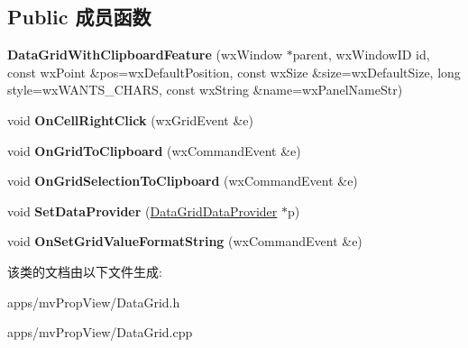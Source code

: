 \subsection*{Public 成员函数}
\begin{DoxyCompactItemize}
\item 
\hypertarget{class_data_grid_with_clipboard_feature_a6b2530106f823da713a736117e4e26b2}{{\bfseries Data\+Grid\+With\+Clipboard\+Feature} (wx\+Window $\ast$parent, wx\+Window\+I\+D id, const wx\+Point \&pos=wx\+Default\+Position, const wx\+Size \&size=wx\+Default\+Size, long style=wx\+W\+A\+N\+T\+S\+\_\+\+C\+H\+A\+R\+S, const wx\+String \&name=wx\+Panel\+Name\+Str)}\label{class_data_grid_with_clipboard_feature_a6b2530106f823da713a736117e4e26b2}

\item 
\hypertarget{class_data_grid_with_clipboard_feature_ae835b2ae0b074f909b282d744dfa3322}{void {\bfseries On\+Cell\+Right\+Click} (wx\+Grid\+Event \&e)}\label{class_data_grid_with_clipboard_feature_ae835b2ae0b074f909b282d744dfa3322}

\item 
\hypertarget{class_data_grid_with_clipboard_feature_a66a1ecf5f2fba82d28f0a6a027c42e0f}{void {\bfseries On\+Grid\+To\+Clipboard} (wx\+Command\+Event \&e)}\label{class_data_grid_with_clipboard_feature_a66a1ecf5f2fba82d28f0a6a027c42e0f}

\item 
\hypertarget{class_data_grid_with_clipboard_feature_aa4e3a7db81601c5a94a784a6f88e64c4}{void {\bfseries On\+Grid\+Selection\+To\+Clipboard} (wx\+Command\+Event \&e)}\label{class_data_grid_with_clipboard_feature_aa4e3a7db81601c5a94a784a6f88e64c4}

\item 
\hypertarget{class_data_grid_with_clipboard_feature_a29a1893aef97e07d38af83890500bac1}{void {\bfseries Set\+Data\+Provider} (\hyperlink{class_data_grid_data_provider}{Data\+Grid\+Data\+Provider} $\ast$p)}\label{class_data_grid_with_clipboard_feature_a29a1893aef97e07d38af83890500bac1}

\item 
\hypertarget{class_data_grid_with_clipboard_feature_a586daff710e8bac0c3535236d84a1b3f}{void {\bfseries On\+Set\+Grid\+Value\+Format\+String} (wx\+Command\+Event \&e)}\label{class_data_grid_with_clipboard_feature_a586daff710e8bac0c3535236d84a1b3f}

\end{DoxyCompactItemize}


该类的文档由以下文件生成\+:\begin{DoxyCompactItemize}
\item 
apps/mv\+Prop\+View/Data\+Grid.\+h\item 
apps/mv\+Prop\+View/Data\+Grid.\+cpp\end{DoxyCompactItemize}
